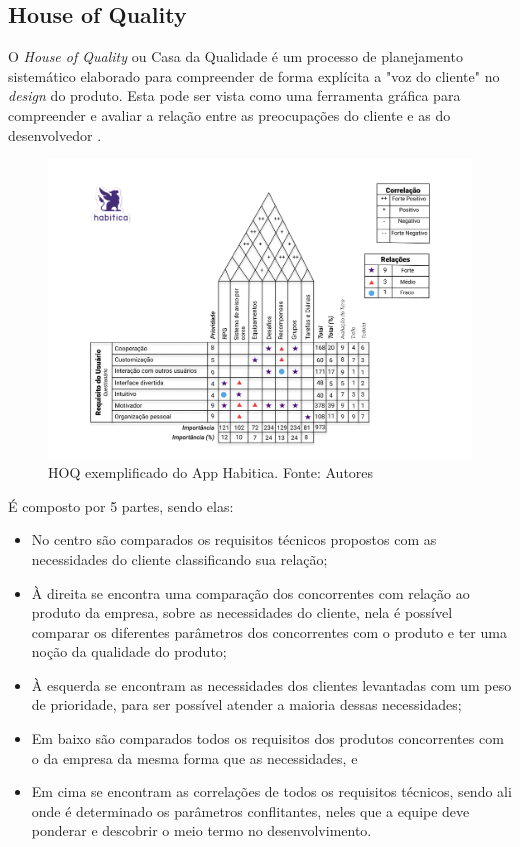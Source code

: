 \subsection{House of Quality}

O \textit{House of Quality} ou Casa da Qualidade é um processo de planejamento sistemático elaborado para compreender de forma explícita a "voz do cliente" no \textit{design} do produto. Esta pode ser vista como uma ferramenta gráfica para compreender e avaliar a relação entre as preocupações do cliente e as do desenvolvedor \cite{Howard_1}.

\begin{figure}[H]
    \begin{center}
        \includegraphics[scale=0.55]{figuras/referencial_teorico/HOQ.jpg}
        \caption{{HOQ exemplificado do App Habitica. Fonte: Autores}}
        \label{grafo_1}
    \end{center}
\end{figure}

É composto por 5 partes, sendo elas:

\begin{itemize}
    \item No centro são comparados os requisitos técnicos propostos com as necessidades do cliente classificando sua relação;
    \item À direita se encontra uma comparação dos concorrentes com relação ao produto da empresa, sobre as necessidades do cliente, nela é possível comparar os diferentes parâmetros dos concorrentes com o produto e ter uma noção da qualidade do produto;
    \item À esquerda se encontram as necessidades dos clientes levantadas com um peso de prioridade, para ser possível atender a maioria dessas necessidades;
    \item Em baixo são comparados todos os requisitos dos produtos concorrentes com o da empresa da mesma forma que as necessidades, e
    \item Em cima se encontram as correlações de todos os requisitos técnicos, sendo ali onde é determinado os parâmetros conflitantes, neles que a equipe deve ponderar e descobrir o meio termo no desenvolvimento.
\end{itemize}

